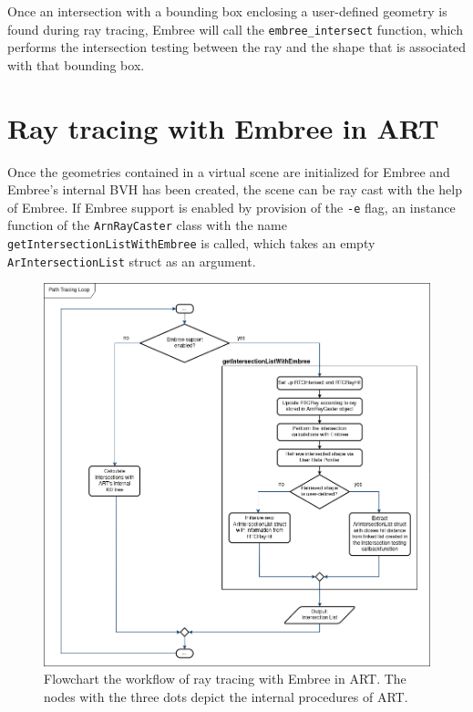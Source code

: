 Once an intersection with a bounding box enclosing a user-defined geometry is found during ray tracing, Embree will call the \texttt{embree\_intersect} function, which performs the intersection testing between the ray and the shape that is associated with that bounding box.




\section{Ray tracing with Embree in ART}
\label{sec:embree_raycasting}

Once the geometries contained in a virtual scene are initialized for Embree and Embree's internal BVH has been created, the scene can be ray cast with the help of Embree. If Embree support is enabled by provision of the \texttt{-e} flag, an instance function of the \texttt{ArnRayCaster} class with the name \texttt{getIntersectionListWithEmbree} is called, which takes an empty \texttt{ArIntersectionList} struct as an argument.

\begin{figure} 
	\centering
	\includegraphics[width=1\linewidth]{img/3 approach/getIntersectionListWithEmbree.png}
	\caption{Flowchart the workflow of ray tracing with Embree in ART. The nodes with the three dots depict the internal procedures of ART.}
	\label{fig:raytracing_chart}
\end{figure}

